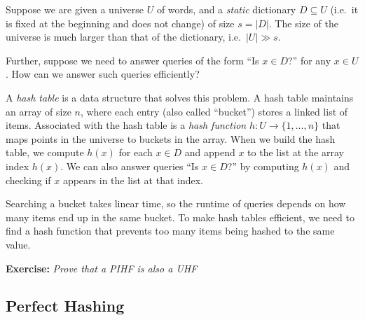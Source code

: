 \documentclass[11pt]{article}
\begin{document}
Suppose we are given a universe $U$ of words, and a \emph{static} dictionary $D\subseteq U$ (i.e.\ it is fixed at the beginning and does not change) of size $s=|D|$. The size of the universe is much larger than that of the dictionary, i.e.\ $|U| \gg s$.

Further, suppose we need to answer queries of the form ``Is $x \in D$?'' for any $x \in U$. How can we answer such queries efficiently?

A \emph{hash table} is a data structure that solves this problem. A hash table maintains an array of size $n$, where each entry (also called ``bucket'') stores a linked list of items. Associated with the hash table is a \emph{hash function} $h: U \rightarrow \{1,\ldots,n\}$ that maps points in the universe to buckets in the array. When we build the hash table, we compute $h(x)$ for each $x\in D$ and append $x$ to the list at the array index $h(x)$. We can also answer queries ``Is $x \in D$?'' by computing $h(x)$ and checking if $x$ appears in the list at that index.

Searching a bucket takes linear time, so the runtime of queries depends on how many items end up in the same bucket. To make hash tables efficient, we need to find a hash function that prevents too many items being hashed to the same value.


%
\marginpar{\Large \WritingHand} \begin{mdframed}[backgroundcolor=teal!10,topline=false,bottomline=false,leftline=false,rightline=false] 
		{\bf Exercise:}{ \em Prove that a PIHF is also a UHF}
\end{mdframed}

\subsection{Perfect Hashing}
\end{document}
